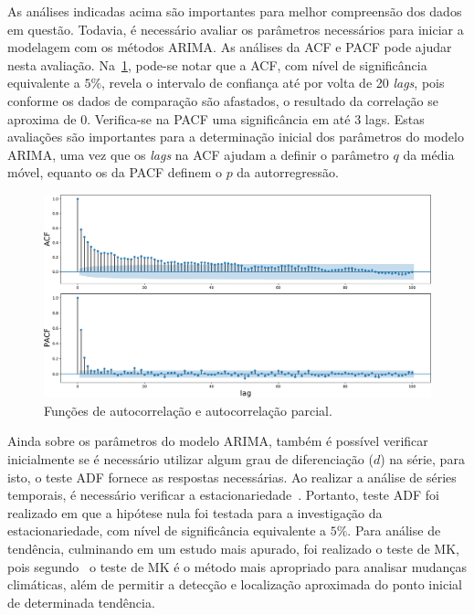 \documentclass[a4paper]{ifacconf}
\begin{document}
As análises indicadas acima são importantes para melhor compreensão dos dados em questão. Todavia, é necessário avaliar os parâmetros necessários para iniciar a modelagem com os métodos \ac{ARIMA}. As análises da \ac{ACF} e \ac{PACF} pode ajudar nesta avaliação. 
Na~\ref{fig:ACF_PACF}, pode-se notar que a \ac{ACF}, com nível de significância equivalente a $5\%$, revela o intervalo de confiança até por volta de 20 \textit{lags}, pois conforme os dados de comparação são afastados, o resultado da correlação se aproxima de 0. Verifica-se na \ac{PACF} uma significância em até 3 lags. Estas avaliações são importantes para a determinação inicial dos parâmetros do modelo \ac{ARIMA}, uma vez que os \textit{lags} na \ac{ACF} ajudam a definir o parâmetro $q$ da média móvel, equanto os da \ac{PACF} definem o $p$ da autorregressão.

\begin{figure} %
	\centering
	\includegraphics[width=0.9\columnwidth]{images/acf_pacf.pdf}
	\caption{Funções de autocorrelação e autocorrelação parcial.}\label{fig:ACF_PACF}
\end{figure}

Ainda sobre os parâmetros do modelo \ac{ARIMA}, também é possível verificar inicialmente se é necessário utilizar algum grau de diferenciação ($d$) na série, para isto, o teste \ac{ADF} fornece as respostas necessárias. Ao realizar a análise de séries temporais, é necessário verificar a estacionariedade~\cite{Vasconcellos2000}. Portanto, teste \ac{ADF} foi realizado em que a hipótese nula foi testada para a investigação da estacionariedade, com nível de significância equivalente a $5\%$. Para análise de tendência, culminando em um estudo mais apurado, foi realizado o teste de \ac{MK}, pois segundo~\cite{Goossens1986} o teste de \ac{MK} é o método mais apropriado para analisar mudanças climáticas, além de permitir a detecção e localização aproximada do ponto inicial de determinada tendência.
\end{document}
